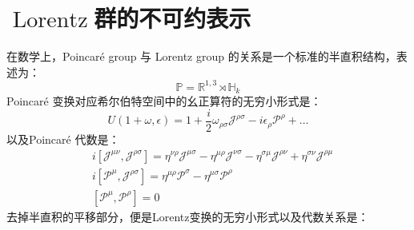 \newpage\section{$\operatorname{Lorentz}$群的不可约表示}
在数学上，Poincaré group 与 Lorentz group 的关系是一个标准的半直积结构，表述为：
\begin{equation}
\boxed{
\mathbb{P} = \mathbb{R}^{1,3} \rtimes \mathbb{H}_k
}
\end{equation}
Poincar\'e 变换对应希尔伯特空间中的幺正算符的无穷小形式是：
\begin{equation*}
    {U}(1+\omega,\epsilon)={1}+\frac{i}{2}\omega_{\rho\sigma}\mathscr{J}^{\rho\sigma}-i\epsilon_\rho \mathscr{P}^\rho+\ldots
\end{equation*}
以及Poincar\'e 代数是：
    \begin{equation*}
            \begin{aligned}
        &i\left[\mathscr{J}^{\mu\nu},\mathscr{J}^{\rho\sigma} \right]=
        \eta^{\nu\rho}\mathscr{J}^{\mu\sigma}
        -\eta^{\mu\rho}\mathscr{J}^{\nu\sigma}
        -\eta^{\sigma\mu}\mathscr{J}^{\rho\nu}
        +\eta^{\sigma\nu}\mathscr{J}^{\rho\mu}\\
        &i\left[\mathscr{P}^\mu,\mathscr{J}^{\rho\sigma} \right]=
        \eta^{\mu\rho}\mathscr{P}^\sigma-\eta^{\mu\sigma}\mathscr{P}^\rho\\
        &\left[ \mathscr{P}^\mu,\mathscr{P}^\rho\right]=0
    \end{aligned}
\end{equation*}
去掉半直积的平移部分，便是Lorentz变换的无穷小形式以及代数关系是：

